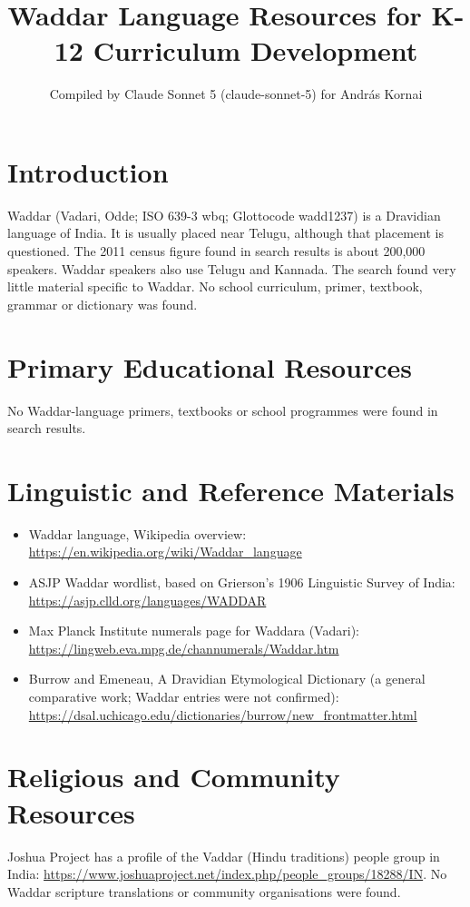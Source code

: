 \documentclass[12pt]{article}
\title{Waddar Language Resources for K-12 Curriculum Development}
\author{Compiled by Claude Sonnet 5 (claude-sonnet-5) for Andr\'as Kornai}
\date{}
\begin{document}
\maketitle

\section{Introduction}
Waddar (Vadari, Odde; ISO 639-3 wbq; Glottocode wadd1237) is a Dravidian language of India. It is usually placed near Telugu, although that placement is questioned. The 2011 census figure found in search results is about 200,000 speakers. Waddar speakers also use Telugu and Kannada. The search found very little material specific to Waddar. No school curriculum, primer, textbook, grammar or dictionary was found.

\section{Primary Educational Resources}
No Waddar-language primers, textbooks or school programmes were found in search results.

\section{Linguistic and Reference Materials}
\begin{itemize}
\item Waddar language, Wikipedia overview: \url{https://en.wikipedia.org/wiki/Waddar_language}
\item ASJP Waddar wordlist, based on Grierson's 1906 Linguistic Survey of India: \url{https://asjp.clld.org/languages/WADDAR}
\item Max Planck Institute numerals page for Waddara (Vadari): \url{https://lingweb.eva.mpg.de/channumerals/Waddar.htm}
\item Burrow and Emeneau, A Dravidian Etymological Dictionary (a general comparative work; Waddar entries were not confirmed): \url{https://dsal.uchicago.edu/dictionaries/burrow/new_frontmatter.html}
\end{itemize}

\section{Religious and Community Resources}
Joshua Project has a profile of the Vaddar (Hindu traditions) people group in India: \url{https://www.joshuaproject.net/index.php/people_groups/18288/IN}. No Waddar scripture translations or community organisations were found.
\end{document}
